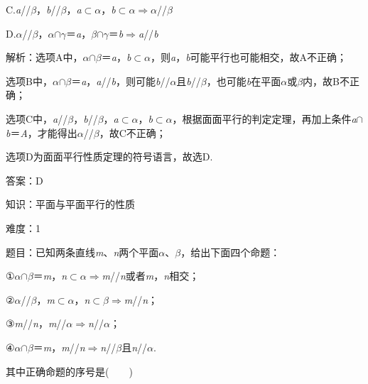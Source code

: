 \documentclass{article} %
\begin{document}
C.\textit{a}//\textit{$\beta$}，\textit{b}//\textit{$\beta$}，\textit{a}$\mathrm{\subset }$\textit{$\alpha$}，\textit{b}$\mathrm{\subset }$\textit{$\alpha$}$\mathrm{\Rightarrow }$\textit{$\alpha$}//\textit{$\beta$}

D.\textit{$\alpha$}//\textit{$\beta$}，\textit{$\alpha$}$\mathrm{\cap}$\textit{$\gamma$}＝\textit{a}，\textit{$\beta$}$\mathrm{\cap}$\textit{$\gamma$}＝\textit{b}$\mathrm{\Rightarrow }$\textit{a}//\textit{b}

解析：选项A中，\textit{$\alpha$}$\mathrm{\cap}$\textit{$\beta$}＝\textit{a}，\textit{b}$\mathrm{\subset }$\textit{$\alpha$}，则\textit{a}，\textit{b}可能平行也可能相交，故A不正确；

选项B中，\textit{$\alpha$}$\mathrm{\cap}$\textit{$\beta$}＝\textit{a}，\textit{a}//\textit{b}，则可能\textit{b}//\textit{$\alpha$}且\textit{b}//\textit{$\beta$}，也可能\textit{b}在平面\textit{$\alpha$}或\textit{$\beta$}内，故B不正确；

选项C中，\textit{a}//\textit{$\beta$}，\textit{b}//\textit{$\beta$}，\textit{a}$\mathrm{\subset }$\textit{$\alpha$}，\textit{b}$\mathrm{\subset }$\textit{$\alpha$}，根据面面平行的判定定理，再加上条件\textit{a}$\mathrm{\cap}$\textit{b}＝\textit{A}，才能得出\textit{$\alpha$}//\textit{$\beta$}，故C不正确；

选项D为面面平行性质定理的符号语言，故选D.

答案：D

知识：平面与平面平行的性质

难度：1

题目：已知两条直线\textit{m}、\textit{n}两个平面\textit{$\alpha$}、\textit{$\beta$}，给出下面四个命题：

①\textit{$\alpha$}$\mathrm{\cap}$\textit{$\beta$}＝\textit{m}，\textit{n}$\mathrm{\subset }$\textit{$\alpha$}$\mathrm{\Rightarrow }$\textit{m}//\textit{n}或者\textit{m}，\textit{n}相交；

②\textit{$\alpha$}//\textit{$\beta$}，\textit{m}$\mathrm{\subset }$\textit{$\alpha$}，\textit{n}$\mathrm{\subset }$\textit{$\beta$}$\mathrm{\Rightarrow }$\textit{m}//\textit{n}；

③\textit{m}//\textit{n}，\textit{m}//\textit{$\alpha$}$\mathrm{\Rightarrow }$\textit{n}//\textit{$\alpha$}；

④\textit{$\alpha$}$\mathrm{\cap}$\textit{$\beta$}＝\textit{m}，\textit{m}//\textit{n}$\mathrm{\Rightarrow }$\textit{n}//\textit{$\beta$}且\textit{n}//\textit{$\alpha$}.

其中正确命题的序号是(　　)
\end{document}
